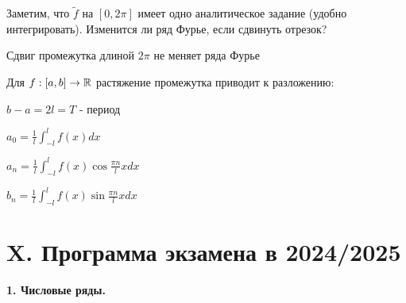 \documentclass[12pt]{article}
\begin{document}
    \mediumvspace

    Заметим, что $\tilde{f}$ на $[0, 2\pi]$ имеет одно аналитическое задание (удобно интегрировать). Изменится ли 
    ряд Фурье, если сдвинуть отрезок?

    \begin{MyTheorem}
        \Ths Сдвиг промежутка длиной $2\pi$ не меняет ряда Фурье
    \end{MyTheorem}

    \begin{MyTheorem}
        \Ths Для $f : [a, b] \to \mathbb{R}$ растяжение промежутка приводит к разложению:

        $b - a = 2l = T$ - период

        $a_0 = \frac{1}{l} \int_{-l}^l f(x) dx$

        $a_n = \frac{1}{l} \int_{-l}^l f(x) \cos \frac{\pi n}{l} x dx$

        $b_n = \frac{1}{l} \int_{-l}^l f(x) \sin \frac{\pi n}{l} x dx$
    \end{MyTheorem}

\section{X. Программа экзамена в 2024/2025}

\begin{center}
    \textbf{1. Числовые ряды.}
\end{center}
\end{document}
